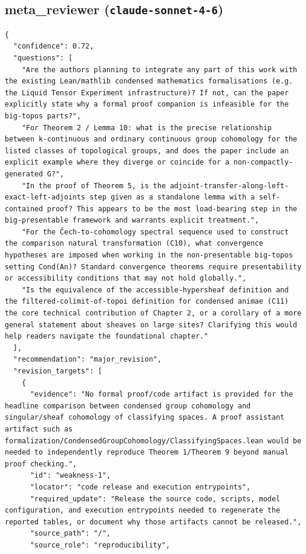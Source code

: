 \documentclass[11pt]{article}
\begin{document}
\subsection*{meta_reviewer (\texttt{claude-sonnet-4-6})}
\begin{verbatim}
{
  "confidence": 0.72,
  "questions": [
    "Are the authors planning to integrate any part of this work with the existing Lean/mathlib condensed mathematics formalisations (e.g. the Liquid Tensor Experiment infrastructure)? If not, can the paper explicitly state why a formal proof companion is infeasible for the big-topos parts?",
    "For Theorem 2 / Lemma 10: what is the precise relationship between k-continuous and ordinary continuous group cohomology for the listed classes of topological groups, and does the paper include an explicit example where they diverge or coincide for a non-compactly-generated G?",
    "In the proof of Theorem 5, is the adjoint-transfer-along-left-exact-left-adjoints step given as a standalone lemma with a self-contained proof? This appears to be the most load-bearing step in the big-presentable framework and warrants explicit treatment.",
    "For the Čech-to-cohomology spectral sequence used to construct the comparison natural transformation (C10), what convergence hypotheses are imposed when working in the non-presentable big-topos setting Cond(An)? Standard convergence theorems require presentability or accessibility conditions that may not hold globally.",
    "Is the equivalence of the accessible-hypersheaf definition and the filtered-colimit-of-topoi definition for condensed animae (C11) the core technical contribution of Chapter 2, or a corollary of a more general statement about sheaves on large sites? Clarifying this would help readers navigate the foundational chapter."
  ],
  "recommendation": "major_revision",
  "revision_targets": [
    {
      "evidence": "No formal proof/code artifact is provided for the headline comparison between condensed group cohomology and singular/sheaf cohomology of classifying spaces. A proof assistant artifact such as formalization/CondensedGroupCohomology/ClassifyingSpaces.lean would be needed to independently reproduce Theorem 1/Theorem 9 beyond manual proof checking.",
      "id": "weakness-1",
      "locator": "code release and execution entrypoints",
      "required_update": "Release the source code, scripts, model configuration, and execution entrypoints needed to regenerate the reported tables, or document why those artifacts cannot be released.",
      "source_path": "/",
      "source_role": "reproducibility",

\end{verbatim}
\end{document}

